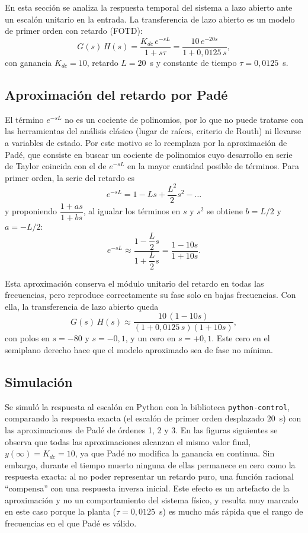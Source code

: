 \documentclass[10pt]{article}
\begin{document}
En esta sección se analiza la respuesta temporal del sistema a lazo abierto ante
un escalón unitario en la entrada. La transferencia de lazo abierto es un modelo
de primer orden con retardo (FOTD):
\begin{equation}
  G(s)\,H(s) = \frac{K_{dc}\, e^{-sL}}{1+s\tau}
  = \frac{10\, e^{-20s}}{1+0{,}0125\,s},
\end{equation}
con ganancia $K_{dc}=10$, retardo $L=20$~s y constante de tiempo
$\tau=0{,}0125$~s.

\subsection{Aproximación del retardo por Padé}

El término $e^{-sL}$ no es un cociente de polinomios, por lo que no puede tratarse
con las herramientas del análisis clásico (lugar de raíces, criterio de Routh) ni
llevarse a variables de estado. Por este motivo se lo reemplaza por la
aproximación de Padé, que consiste en buscar un cociente de polinomios cuyo
desarrollo en serie de Taylor coincida con el de $e^{-sL}$ en la mayor cantidad
posible de términos. Para primer orden, la serie del retardo es
\begin{equation}
  e^{-sL} = 1 - Ls + \frac{L^2}{2}s^2 - \dots
\end{equation}
y proponiendo $\dfrac{1+as}{1+bs}$, al igualar los términos en $s$ y $s^2$ se
obtiene $b = L/2$ y $a=-L/2$:
\begin{equation}
  e^{-sL} \approx \frac{1-\dfrac{L}{2}s}{1+\dfrac{L}{2}s} = \frac{1-10s}{1+10s}.
\end{equation}

Esta aproximación conserva el módulo unitario del retardo en todas las
frecuencias, pero reproduce correctamente su fase solo en bajas frecuencias.
Con ella, la transferencia de lazo abierto queda
\begin{equation}
  G(s)\,H(s) \approx \frac{10\,(1-10s)}{(1+0{,}0125\,s)(1+10s)},
\end{equation}
con polos en $s=-80$ y $s=-0{,}1$, y un cero en $s=+0{,}1$. Este cero en el
semiplano derecho hace que el modelo aproximado sea de fase no mínima.

\subsection{Simulación}

Se simuló la respuesta al escalón en Python con la biblioteca
\texttt{python-control}, comparando la respuesta exacta (el escalón de primer
orden desplazado $20$~s) con las aproximaciones de Padé de órdenes 1, 2 y 3.
En las figuras siguientes se observa que todas las aproximaciones alcanzan el
mismo valor final, $y(\infty)=K_{dc}=10$, ya que Padé no modifica la ganancia en
continua. Sin embargo, durante el tiempo muerto ninguna de ellas permanece en
cero como la respuesta exacta: al no poder representar un retardo puro, una
función racional ``compensa'' con una respuesta inversa inicial. Este efecto es
un artefacto de la aproximación y no un comportamiento del sistema físico, y
resulta muy marcado en este caso porque la planta ($\tau=0{,}0125$~s) es mucho
más rápida que el rango de frecuencias en el que Padé es válido.
\end{document}
